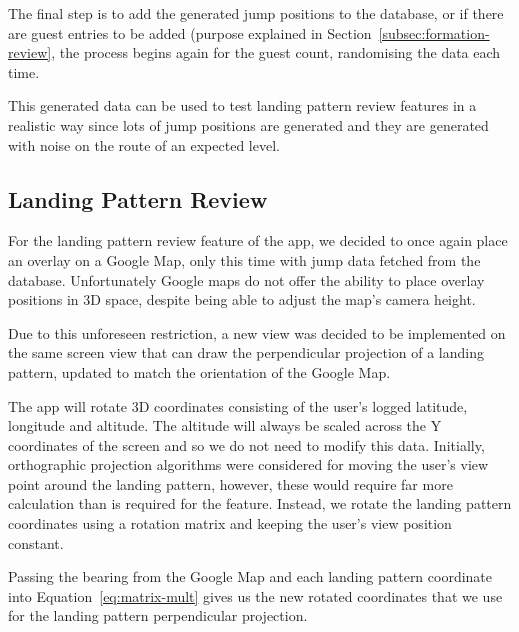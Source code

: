 The final step is to add the generated jump positions to the database, or if there are guest entries to be added (purpose explained in Section~\vref{subsec:formation-review}, the process begins again for the guest count, randomising the data each time.

This generated data can be used to test landing pattern review features in a realistic way since lots of jump positions are generated and they are generated with noise on the route of an expected level.

\subsection{Landing Pattern Review}
For the landing pattern review feature of the app, we decided to once again place an overlay on a Google Map, only this time with jump data fetched from the database. Unfortunately Google maps do not offer the ability to place overlay positions in 3D space, despite being able to adjust the map's camera height.

Due to this unforeseen restriction, a new view was decided to be implemented on the same screen view that can draw the perpendicular projection of a landing pattern, updated to match the orientation of the Google Map.

The app will rotate 3D coordinates consisting of the user's logged latitude, longitude and altitude.
The altitude will always be scaled across the Y coordinates of the screen and so we do not need to modify this data. Initially, orthographic projection algorithms were considered for moving the user's view point around the landing pattern, however, these would require far more calculation than is required for the feature. Instead, we rotate the landing pattern coordinates using a rotation matrix and keeping the user's view position constant.

Passing the bearing from the Google Map and each landing pattern coordinate into Equation~\vref{eq:matrix-mult} gives us the new rotated coordinates that we use for the landing pattern perpendicular projection.

